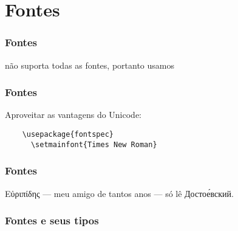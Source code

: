 \section{Fontes}

\begin{frame}
  \frametitle{Fontes}
  \LARGE
   não suporta todas as fontes, portanto usamos 
\end{frame}

\begin{frame}[fragile]
  \frametitle{Fontes}
  \LARGE
  Aproveitar as vantagens do Unicode:
  \begin{verbatim}
    \usepackage{fontspec}
      \setmainfont{Times New Roman}
  \end{verbatim}
\end{frame}

\begin{frame}
  \frametitle{Fontes}
  \LARGE
  Εὐριπίδης — meu amigo de tantos anos — só lê Достое́вский.
\end{frame}

\begin{frame}[fragile]
  \frametitle{Fontes e seus tipos}
  \LARGE
\end{frame}

